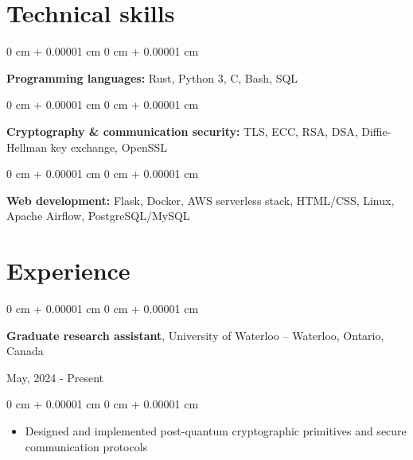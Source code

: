 \documentclass[10pt, letterpaper]{article}
\newenvironment{highlights}{
    \begin{itemize}[
        topsep=0.10 cm,
        parsep=0.10 cm,
        partopsep=0pt,
        itemsep=0pt,
        leftmargin=0 cm + 10pt
    ]
}{
    \end{itemize}
} %
\newenvironment{onecolentry}{
    \begin{adjustwidth}{
        0 cm + 0.00001 cm
    }{
        0 cm + 0.00001 cm
    }
}{
    \end{adjustwidth}
} %
\newenvironment{twocolentry}[2][]{
    \onecolentry
    \def\secondColumn{#2}
    \setcolumnwidth{\fill, 4.5 cm}
    \begin{paracol}{2}
}{
    \switchcolumn \raggedleft \secondColumn
    \end{paracol}
    \endonecolentry
} %
\begin{document}
    \section{Technical skills}
        \begin{onecolentry}
            \textbf{Programming languages:} Rust, Python 3, C, Bash, SQL
        \end{onecolentry}
        \vspace{0.2 cm}
        \begin{onecolentry}
            \textbf{Cryptography \& communication security:} TLS, ECC, RSA, DSA, Diffie-Hellman key exchange, OpenSSL
        \end{onecolentry}
        \vspace{0.2 cm}
        \begin{onecolentry}
            \textbf{Web development:} Flask, Docker, AWS serverless stack, HTML/CSS, Linux, Apache Airflow, PostgreSQL/MySQL
        \end{onecolentry}

    \section{Experience}
        \begin{twocolentry}{
            May, 2024 - Present
        }
            \textbf{Graduate research assistant}, University of Waterloo -- Waterloo, Ontario, Canada
        \end{twocolentry}
        \vspace{0.10 cm}
        \begin{onecolentry}
            \begin{highlights}
                \item Designed and implemented post-quantum cryptographic primitives and secure communication protocols
            \end{highlights}
        \end{onecolentry}
        \vspace{0.2 cm}
\end{document}
